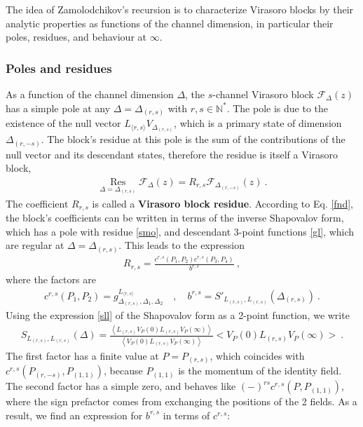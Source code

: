 \documentclass[12pt, a4paper]{article}
\newcommand{\myindex}[1]{\textbf{\boldmath #1}}
\begin{document}
The idea of Zamolodchikov's recursion is to characterize Virasoro blocks by their analytic properties as functions of the channel dimension, in particular their poles, residues, and behaviour at $\infty$. 

\subsubsection{Poles and residues}

As a function of the channel dimension $\Delta$, the $s$-channel Virasoro block $\mathcal{F}_\Delta(z)$ has a simple pole at any $\Delta=\Delta_{(r,s)}$ with $r,s\in\mathbb{N}^*$. 
The pole is due to the existence of the null vector $L_{\langle r,s\rangle}V_{\Delta_{(r,s)}}$, which is a primary state of dimension $\Delta_{(r,-s)}$. The block's residue at this pole is the sum of the contributions of the null vector and its descendant states, therefore the residue is itself a Virasoro block,
\begin{align}
 \boxed{\underset{\Delta=\Delta_{(r,s)}}{\operatorname{Res}} \mathcal{F}_\Delta(z) = R_{r,s}\mathcal{F}_{\Delta_{(r,-s)}}(z)}\ .
 \label{resf}
\end{align}
The coefficient $R_{r,s}$ is called a \myindex{Virasoro block residue}. 
According to Eq. \eqref{fnd}, the block's coefficients can be written in terms of the inverse Shapovalov form, which has a pole with residue \eqref{smo}, and descendant 3-point functions \eqref{gl}, which are regular at $\Delta=\Delta_{(r,s)}$. This leads to the expression \begin{align}
\boxed{R_{r,s} = \frac{c^{r,s}(P_1,P_2)c^{r,s}(P_3,P_4)}{b^{r,s}}}\ , 
 \label{rrs}
\end{align}
where the factors are 
\begin{align}
 c^{r,s}(P_1,P_2) = g^{L_{\langle r,s\rangle}}_{\Delta_{(r,s)},\Delta_1,\Delta_2} \quad , \quad b^{r,s} =
 S'_{L_{(r,s)},L_{(r,s)}}(\Delta_{(r,s)})\ .
\end{align}
Using the expression \eqref{sll} of the Shapovalov form as a 2-point function, we write
\begin{align}
 S_{L_{(r,s)},L_{(r,s)}}(\Delta) = \frac{ \left<L_{(r,s)}V_P(0)L_{(r,s)}V_P(\infty)\right>}{\left<V_P(0)L_{(r,s)}V_P(\infty)\right>} \Big<V_P(0)L_{(r,s)}V_P(\infty)\Big> \ . 
\end{align}
The first factor has a finite value at $P=P_{(r,s)}$, which coincides with $c^{r,s}(P_{(r,-s)},P_{(1,1)})$, because $P_{(1,1)}$ is the momentum of the identity field. The second factor has a simple zero, and behaves like $(-)^{rs} c^{r,s}(P, P_{(1,1)})$, where the sign prefactor comes from exchanging the positions of the 2 fields. As a result, we find an expression for $b^{r,s}$ in terms of $c^{r,s}$:
\end{document}
